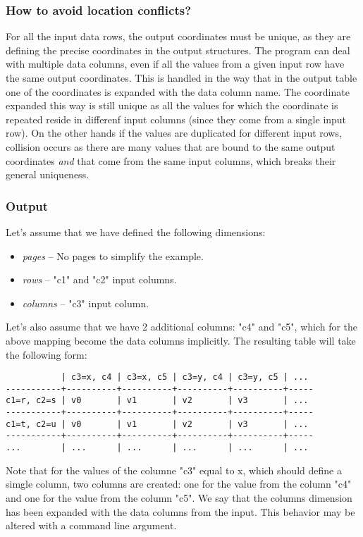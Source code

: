 \documentclass{report}
\begin{document}
\subsubsection{How to avoid location conflicts?}
For all the input data rows, the output coordinates must be unique, as they are
defining the precise coordinates in the output structures. The program can deal
with multiple data columns, even if all the values from a given input row have the
same output coordinates. This is handled in the way that in the output table one
of the coordinates is expanded with the data column name. The coordinate expanded
this way is still unique as all the values for which the coordinate is repeated
reside in differenf input columns (since they come from a single input row). On
the other hands if the values are duplicated for different input rows, collision
occurs as there are many values that are bound to the same output coordinates
\textit{and} that come from the same input columns, which breaks their general
uniqueness.

\subsubsection{Output}
Let's assume that we have defined the following dimensions:
\begin{itemize}
	\item \textit{pages} -- No pages to simplify the example.
	\item \textit{rows} -- "c1" and "c2" input columns.
	\item \textit{columns} -- "c3" input column.
\end{itemize}

Let's also assume that we have 2 additional columns: "c4" and "c5", which for
the above mapping become the data columns implicitly. The resulting table will
take the following form:

\begin{verbatim}
           | c3=x, c4 | c3=x, c5 | c3=y, c4 | c3=y, c5 | ...
-----------+----------+----------+----------+----------+-----
c1=r, c2=s | v0       | v1       | v2       | v3       | ...
-----------+----------+----------+----------+----------+-----
c1=t, c2=u | v0       | v1       | v2       | v3       | ...
-----------+----------+----------+----------+----------+-----
...        | ...      | ...      | ...      | ...      | ...
\end{verbatim}

Note that for the values of the columne "c3" equal to x, which should define
a simgle column, two columns are created: one for the value from the column
"c4" and one for the value from the column "c5". We say that the columns
dimension has been expanded with the data columns from the input. This behavior
may be altered with a command line argument.
\end{document}
